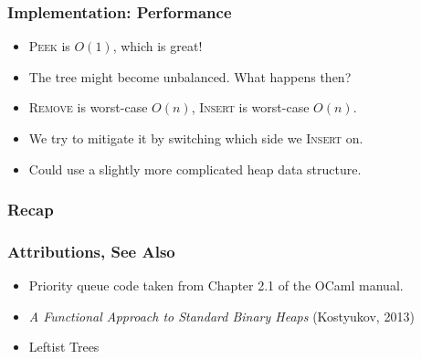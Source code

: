 \documentclass{beamer}
\begin{document}
\begin{frame}
\frametitle{Implementation: Performance}
\begin{itemize}
\item \textsc{Peek} is $O(1)$, which is great! \pause
\item The tree might become unbalanced. What happens then? \pause
\item \textsc{Remove} is worst-case $O(n)$, \textsc{Insert} is worst-case $O(n)$.
\item We try to mitigate it by switching which side we \textsc{Insert} on. \pause
\item Could use a slightly more complicated heap data structure.
\end{itemize}
\end{frame}

\begin{frame}
\frametitle{Recap}
\begin{center}
{\huge \smiley{}}
\end{center}
\end{frame}

\begin{frame}
\frametitle{Attributions, See Also}

\begin{itemize}
\item Priority queue code taken from Chapter 2.1 of the OCaml manual.
\item \textit{A Functional Approach to Standard Binary Heaps} (Kostyukov, 2013)
\item Leftist Trees
\end{itemize}
\end{frame}
\end{document}
